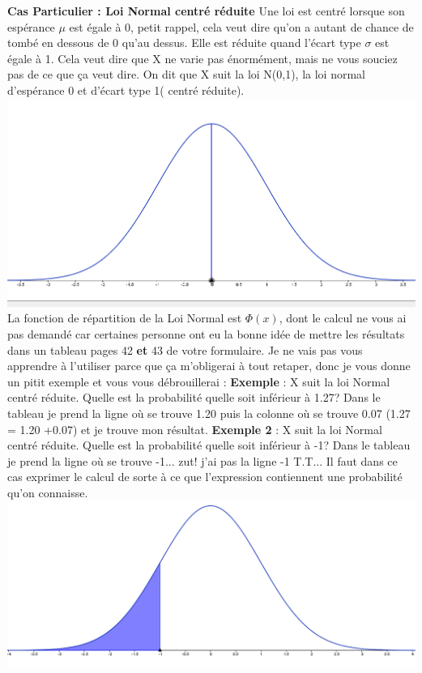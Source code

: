 \documentclass[a4paper]{article}
\begin{document}
\textbf{Cas Particulier : Loi Normal centré réduite}
\newline
Une loi est centré lorsque son espérance \textbf{$\mu$} est égale à 0, petit rappel, cela veut dire qu'on a autant de chance de tombé en dessous de 0 qu'au dessus. Elle est réduite quand l'écart type \textbf{$\sigma$} est égale à 1. Cela veut dire que X ne varie pas énormément, mais ne vous souciez pas de ce que ça veut dire. On dit que X suit la loi N(0,1), la loi normal d'espérance 0 et d'écart type 1( centré réduite).
\newline
\includegraphics[scale=0.6]{Graph5.png}
\newline
La fonction de répartition de la Loi Normal est $\Phi (x)$, dont le calcul ne vous ai pas demandé car certaines personne ont eu la bonne idée de mettre les résultats dans un tableau pages 42 \textbf{et} 43 de votre formulaire. Je ne vais pas vous apprendre à l'utiliser parce que ça m'obligerai à tout retaper, donc  je vous donne un pitit exemple et vous vous débrouillerai :
\textbf{Exemple }:
X suit la loi Normal centré réduite. Quelle est la probabilité quelle soit inférieur à 1.27? \newline
Dans le tableau je prend la ligne où se trouve 1.20 puis la colonne où se trouve 0.07 (1.27 = 1.20 +0.07) et je trouve mon résultat.
\textbf{Exemple 2 }:
X suit la loi Normal centré réduite. Quelle est la probabilité quelle soit inférieur à -1? \newline
Dans le tableau je prend la ligne où se trouve -1... zut! j'ai pas la ligne -1 T.T... Il faut dans ce cas exprimer le calcul de sorte à ce que l'expression contiennent une probabilité qu'on connaisse. 
\newline
\includegraphics[scale=0.6]{Graph6.png}
\end{document}
